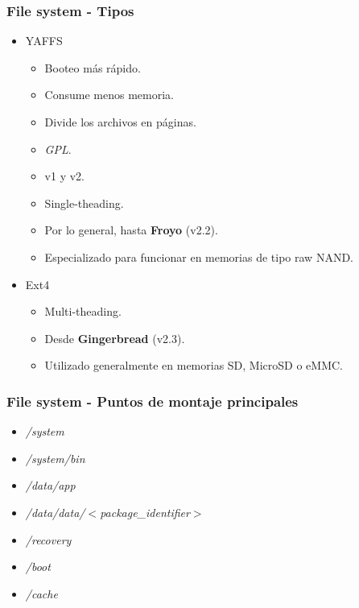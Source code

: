 \begin{frame}
  \frametitle{File system - Tipos}
  \begin{itemize}
      \item YAFFS
      \begin{itemize}
  \item Booteo más rápido.
  
  \item Consume menos memoria.
  
  \item Divide los archivos en páginas.
  
  \item \textit{GPL}.
  
  \item v1 y v2.
  
  \item Single-theading.
  
  \item Por lo general, hasta \textbf{Froyo} (v2.2).
  
  \item Especializado para funcionar en memorias de tipo raw NAND.
      \end{itemize}
      
      \item Ext4
      \begin{itemize}
  \item Multi-theading.
  
  \item Desde \textbf{Gingerbread} (v2.3).
  
  \item Utilizado generalmente en memorias SD, MicroSD o eMMC.
      \end{itemize}   
  \end{itemize}
\end{frame}

\begin{frame}[fragile]
  \frametitle{File system - Puntos de montaje principales}
  \begin{itemize}
      \item \textit{/system}
      
      \item \textit{/system/bin}
      
      \item \textit{/data/app}
      
      \item \textit{/data/data/$<$package\_identifier$>$}
      
      \item \textit{/recovery}
      
      \item \textit{/boot}
      
      \item \textit{/cache}
  \end{itemize}
\end{frame}

